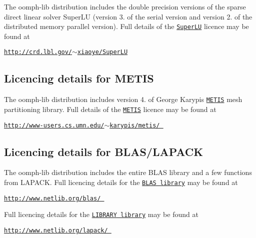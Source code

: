 The {\ttfamily oomph-\/lib} distribution includes the double precision versions of the sparse direct linear solver Super\+LU (version 3. of the serial version and version 2. of the distributed memory parallel version). Full details of the \href{http://crd.lbl.gov/~xiaoye/SuperLU}{\tt Super\+LU} licence may be found at \begin{center} \href{http://crd.lbl.gov/~xiaoye/SuperLU}{\tt http\+://crd.\+lbl.\+gov/$\sim$xiaoye/\+Super\+LU} \end{center} 





\subsection*{Licencing details for M\+E\+T\+IS}

The {\ttfamily oomph-\/lib} distribution includes version 4. of George Karypis\textquotesingle{} \href{http://www-users.cs.umn.edu/~karypis/metis/}{\tt M\+E\+T\+IS} mesh partitioning library. Full details of the \href{http://www-users.cs.umn.edu/~karypis/metis/}{\tt M\+E\+T\+IS} licence may be found at \begin{center} \href{http://www-users.cs.umn.edu/~karypis/metis/}{\tt http\+://www-\/users.\+cs.\+umn.\+edu/$\sim$karypis/metis/ } \end{center} 





\subsection*{Licencing details for B\+L\+A\+S/\+L\+A\+P\+A\+CK}

The {\ttfamily oomph-\/lib} distribution includes the entire B\+L\+AS library and a few functions from L\+A\+P\+A\+CK. Full licencing details for the \href{http://www.netlib.org/blas/}{\tt B\+L\+AS library} may be found at \begin{center} \href{http://www.netlib.org/blas/}{\tt http\+://www.\+netlib.\+org/blas/ } \end{center}  Full licencing details for the \href{http://www.netlib.org/lapack/}{\tt L\+I\+B\+R\+A\+RY library} may be found at \begin{center} \href{http://www.netlib.org/lapack/}{\tt http\+://www.\+netlib.\+org/lapack/ } \end{center} 






